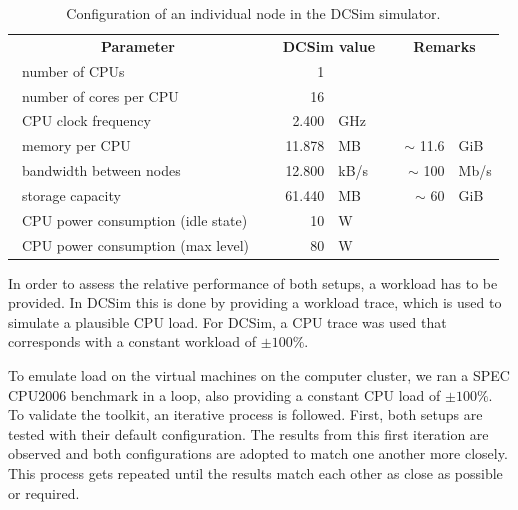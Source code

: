 \documentclass[conference, 10pt]{IEEEtran}
\begin{document}
\begin{table}
	\renewcommand{\arraystretch}{1.3}
	\caption{Configuration of an individual node in the DCSim simulator.}
	\label{dcsim:vw}
	\begin{center}
	\tabcolsep=0.05cm
	\begin{tabularx}{3.45in}{|X|rl|rl|}
		\hline
		 \multicolumn{1}{|c|}{\multirow{2}{*}{\textbf{Parameter}}} & \multicolumn{2}{c|}{\multirow{2}{*}{\textbf{\ DCSim value\ }}} &   \multicolumn{2}{c|}{\multirow{2}{*}{\textbf{Remarks}}} \\
		&&&& \\
		\hline
		\ number of CPUs& 1 &&& \\
		\ number of cores per CPU \ & 16&&& \\
		\ CPU clock frequency& 2.400&GHz&& \\
		\ memory per CPU & 11.878 &MB& \ $\sim$ 11.6 & GiB\\
		\ bandwidth between nodes & 12.800 & kB/s \  & \ $\sim$ 100 & Mb/s \\
		\ storage capacity & \   61.440& MB & \ $\sim$ 60 & GiB \\
		\ CPU power consumption (idle state) \ &10&W& \multicolumn{2}{c|}{\cite{vw-CPU:idleusage}}\\
		\ CPU power consumption (max level) \  &80&W&\multicolumn{2}{c|}{\cite{vw-CPU:idleusage, vw-CPU:maxusage}} \\
		\hline
	\end{tabularx}
	\end{center}
\end{table}



In order to assess the relative performance of both setups, a workload has to be provided. In DCSim this is done by providing a workload trace, which is used to simulate a plausible CPU load. For DCSim, a CPU trace was used that corresponds with a constant workload of $\pm100\%$. 

To emulate load on the virtual machines on the computer cluster, we ran a SPEC CPU2006\cite{spec2006} benchmark in a loop, also providing a constant CPU load of $\pm100\%$.\\

To validate the toolkit, an iterative process is followed. First, both setups are tested with their default configuration. The results from this first iteration are observed and both configurations are adopted to match one another more closely. This process gets repeated until the results match each other as close as possible or required.
\end{document}
